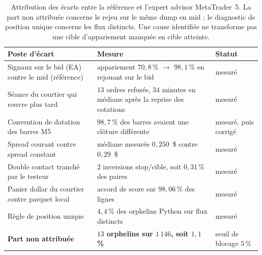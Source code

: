 \begin{table}[htbp]
\centering
\footnotesize
\caption{Attribution des écarts entre la référence et l'expert advisor MetaTrader~5. La part non attribuée concerne le rejeu sur le même dump en mid ; le diagnostic de position unique concerne les flux distincts. Une cause identifiée ne transforme pas une cible d'appariement manquée en cible atteinte.}
\label{tab:x10_mt5_attribution}
\begin{tabular}{p{5.4cm} p{6.4cm} p{2.2cm}}
\toprule
\textbf{Poste d'écart} & \textbf{Mesure} & \textbf{Statut} \\
\midrule
Signaux sur le bid (EA) contre le mid (référence) & appariement $70{,}8$\,\% $\rightarrow$ $98{,}1$\,\% en rejouant sur le bid & mesuré \\
Séance du courtier qui rouvre plus tard & $13$ ordres refusés, $34$ minutes en médiane après la reprise des cotations & mesuré \\
Convention de datation des barres M5 & $98{,}7$\,\% des barres avaient une clôture différente & mesuré, puis corrigé \\
Spread courant contre spread constant & médiane mesurée $0{,}250$~\$ contre $0{,}29$~\$ & mesuré \\
Double contact tranché par le testeur & $2$ inversions stop/cible, soit $0{,}31$\,\% des paires & mesuré \\
Panier dollar du courtier contre parquet local & accord de score sur $98{,}06$\,\% des lignes & mesuré \\
Règle de position unique & $4{,}4$\,\% des orphelins Python sur flux distincts & mesuré \\
\midrule
\textbf{Part non attribuée} & \textbf{$13$ orphelins sur $1\,146$, soit $1{,}1$\,\%} & seuil de blocage $5$\,\% \\
\bottomrule
\end{tabular}
\end{table}
